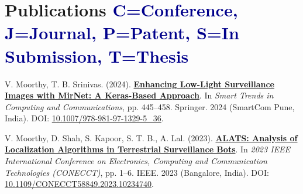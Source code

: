 \documentclass[a4paper,10pt]{article}
\begin{document}
\vspace{-2mm}
\section{\textbf{Publications}
\hfill \textcolor{darkblue}{\scriptsize 
C=Conference, J=Journal, P=Patent, S=In Submission, T=Thesis}}
\vspace{0.1mm}
\small{
\begin{enumerate}[leftmargin=*, labelsep=0.5em, align=left, 
widest={[\textbf{S.1}]}, itemindent=0em, label={\textbf{[\arabic*]}}]
\item[\textbf{[C.1]}] V. Moorthy, T. B. Srinivas. (2024). \href{https://doi.org/10.1007/978-981-97-1329-5_36}{\textbf{Enhancing Low-Light Surveillance Images with MirNet: A Keras-Based Approach}}. In \textit{Smart Trends in Computing and Communications}, pp. 445–458. Springer. 2024 (SmartCom Pune, India). DOI: \href{https://doi.org/10.1007/978-981-97-1329-5_36}{10.1007/978-981-97-1329-5_36}.
\item[\textbf{[C.2]}] V. Moorthy, D. Shah, S. Kapoor, S. T. B., A. Lal. (2023). \href{https://doi.org/10.1109/CONECCT58849.2023.10234740}{\textbf{ALATS: Analysis of Localization Algorithms in Terrestrial Surveillance Bots}}. In \textit{2023 IEEE International Conference on Electronics, Computing and Communication Technologies (CONECCT)}, pp. 1–6. IEEE. 2023 (Bangalore, India). DOI: \href{https://doi.org/10.1109/CONECCT58849.2023.10234740}{10.1109/CONECCT58849.2023.10234740}.
\end{enumerate}
}
\end{document}
